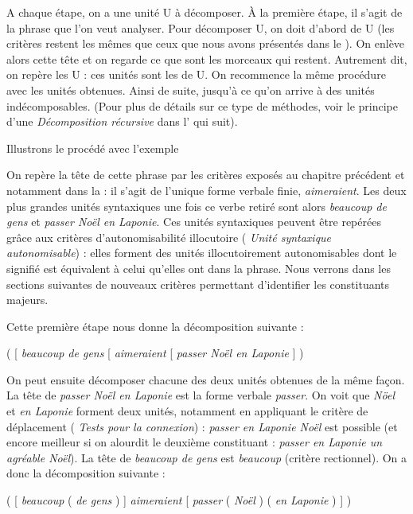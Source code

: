 A chaque étape, on a une unité U à décomposer. À la première étape, il s’agit de la phrase que l’on veut analyser. Pour décomposer U, on doit d’abord  de U (les critères restent les mêmes que ceux que nous avons présentés dans le ). On enlève alors cette tête et on regarde ce que sont les morceaux qui restent. Autrement dit, on repère les   U : ces unités sont les  de U. On recommence la même procédure avec les unités obtenues. Ainsi de suite, jusqu’à ce qu’on arrive à des unités indécomposables. (Pour plus de détails sur ce type de méthodes, voir le principe d’une \textit{Décomposition récursive} dans l’ qui suit).

Illustrons le procédé avec l’exemple 

On repère la tête de cette phrase par les critères exposés au chapitre précédent et notamment dans la  : il s’agit de l’unique forme verbale finie, \textit{aimeraient}. Les deux plus grandes unités syntaxiques une fois ce verbe retiré sont alors \textit{beaucoup de gens} et \textit{passer Noël en Laponie}. Ces unités syntaxiques peuvent être repérées grâce aux critères d’autonomisabilité illocutoire ( \textit{Unité syntaxique autonomisable}) : elles forment des unités illocutoirement autonomisables dont le signifié est équivalent à celui qu’elles ont dans la phrase. Nous verrons dans les sections suivantes de nouveaux critères permettant d’identifier les constituants majeurs.

Cette première étape nous donne la décomposition suivante :

\ea
   ( [ \textit{beaucoup de gens} [ \textit{aimeraient} [ \textit{passer Noël en Laponie} ] )
\z

On peut ensuite décomposer chacune des deux unités obtenues de la même façon. La tête de \textit{passer Noël en Laponie} est la forme verbale \textit{passer}. On voit que \textit{Nöel} et \textit{en Laponie} forment deux unités, notamment en appliquant le critère de déplacement ( \textit{Tests pour la connexion}) : \textit{passer en Laponie Noël} est possible (et encore meilleur si on alourdit le deuxième constituant : \textit{passer en Laponie un agréable Noël}). La tête de \textit{beaucoup de gens} est \textit{beaucoup} (critère rectionnel). On a donc la décomposition suivante :

\ea
      ( [ \textit{beaucoup}  ( \textit{de gens} ) ]  \textit{aimeraient}  [ \textit{passer}  ( \textit{Noël} ) ( \textit{en Laponie} ) ] )
\z


